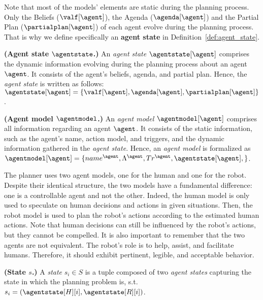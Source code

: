 Note that most of the models' elements are static during the planning process. Only the Beliefs ($\valf[\agent]$), the Agenda ($\agenda[\agent]$) and the Partial Plan ($\partialplan[\agent]$) of each agent evolve during the planning process. 
That is why we define specifically an \textbf{agent state} in Definition~\ref{def:agent_state}.

\begin{definition}
    \label{def:agent_state}
    \textbf{(Agent state $\agentstate$.)} An \emph{agent state} $\agentstate[\agent]$ comprises the dynamic information evolving during the planning process about an agent $\agent$. It consists of the agent's beliefs, agenda, and partial plan. Hence, the \emph{agent state} is written as follows: $\agentstate[\agent] = \{ \valf[\agent], \agenda[\agent], \partialplan[\agent] \}$.
\end{definition}

\begin{definition}
    \textbf{(Agent model $\agentmodel$.)} An \emph{agent model} $\agentmodel[\agent]$ comprises all information regarding an agent $\agent$. It consists of the static information, such as the agent's name, action model, and triggers, and the dynamic information gathered in the \emph{agent state}. Hence,  an \emph{agent model} is formalized as $\agentmodel[\agent] = \{ name^{\agent}, \Lambda^{\agent}, Tr^{\agent}, \agentstate[\agent], \}$.
    \label{def:agent_model}
\end{definition}

The planner uses two agent models, one for the human and one for the robot. Despite their identical structure, the two models have a fundamental difference: one is a controllable agent and not the other. Indeed, the human model is only used to speculate on human decisions and actions in given situations. 
Then, the robot model is used to plan the robot's actions according to the estimated human actions.
Note that human decisions can still be influenced by the robot's actions, but they cannot be compelled.
It is also important to remember that the two agents are not equivalent. The robot's role is to help, assist, and facilitate humans. Therefore, it should exhibit pertinent, legible, and acceptable behavior.

\begin{definition}
    \textbf{(State $s$.)} A \emph{state} $s_i \in S$ is a tuple composed of two \emph{agent states} capturing the state in which the planning problem is, s.t. $s_i = ( \agentstate[H][i], \agentstate[R][i] )$.
    \label{def:state}
\end{definition}
 

